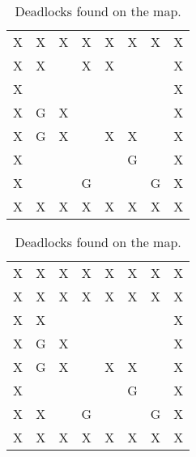 \begin{table}[H]
\begin{subtable}{.5\linewidth}
\centering
\begin{tabular}{| *{8}{c} |}
\hline
X & X & X & X & X & X & X & X \\
X & X &   & X & X &   &   & X \\
X &   &   &   &   &   &   & X \\
X & G & X &   &   &   &   & X \\
X & G & X &   & X & X &   & X \\
X &   &   &   &   & G &   & X \\
X &   &   & G &   &   & G & X \\
X & X & X & X & X & X & X & X \\
\hline
\end{tabular}
\caption{Original test map.}
\label{fig:orig_testmap_deadlock}
\end{subtable}
%
\begin{subtable}{.5\linewidth}
\centering
\begin{tabular}{| *{8}{c} |}
\hline
X & X & X & X & X & X & X & X \\
X & X & X & X & X & X & X & X \\
X & X &   &   &   &   &   & X \\
X & G & X &   &   &   &   & X \\
X & G & X &   & X & X &   & X \\
X &   &   &   &   & G &   & X \\
X & X &   & G &   &   & G & X \\
X & X & X & X & X & X & X & X \\
\hline
\end{tabular}
\caption{Deadlock test map.}
\label{fig:orig_deadlock}
\end{subtable}
\caption{Deadlocks found on the map.}
\label{fig:deadlocks}
\end{table}

